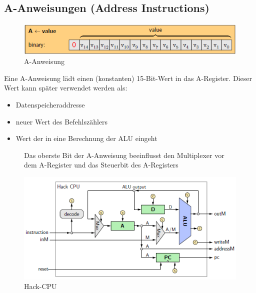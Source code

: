 \documentclass[12pt]{report}
\begin{document}
\subsection{A-Anweisungen (Address Instructions)}

\begin{figure}[H]
  \caption{A-Anweisung}
  \label{fig:maschinensprache_a-anweisung}
  \centering
  \includegraphics{maschinensprache_a-anweisung}
\end{figure}

Eine A-Anweisung lädt einen (konstanten) 15-Bit-Wert in das A-Register.
Dieser Wert kann später verwendet werden als:
\begin{itemize}
  \item Datenspeicheraddresse
  \item neuer Wert des Befehlszählers
  \item Wert der in eine Berechnung der ALU eingeht
\end{itemize}


\begin{figure}[H]
  \begin{minipage}[t]{0.45\textwidth}
    Das oberste Bit der A-Anweisung beeinflusst den Multiplexer vor dem A-Register und das Steuerbit des A-Registers
  \end{minipage}
  \hfill
  \begin{minipage}[t]{0.45\textwidth}
    \caption{Hack-CPU}
    \label{fig:hack_cpu_leitungen1}
    \centering
    \includegraphics[width=\textwidth]{hack_cpu_leitungen}
  \end{minipage}
\end{figure}
\end{document}
